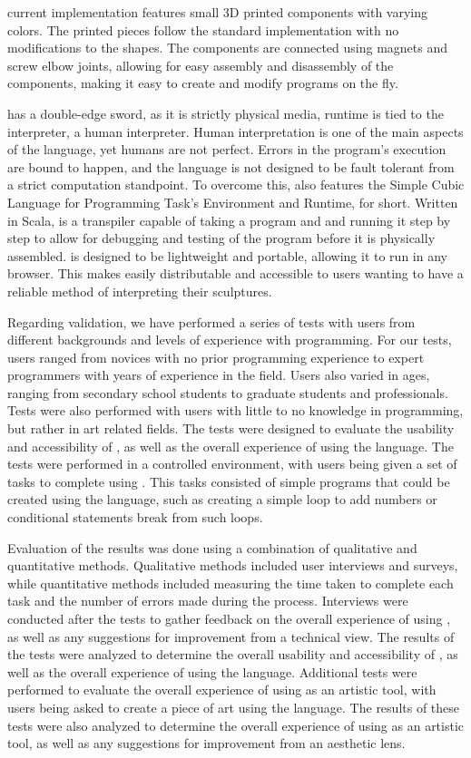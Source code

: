 \sculpt current implementation features small 3D printed components with varying colors.
The printed pieces follow the standard \sculpt implementation with no modifications to the shapes.
The components are connected using magnets and screw elbow joints, allowing for easy assembly and disassembly of the components, making it easy to create and modify programs on the fly.

\sculpt has a double-edge sword, as it is strictly physical media, runtime is tied to the interpreter, a human interpreter.
Human interpretation is one of the main aspects of the language, yet humans are not perfect. Errors in the program's execution are bound to happen, and the language is not designed to be fault tolerant from a strict computation standpoint.
To overcome this, \sculpt also features the Simple Cubic Language for Programming Task's Environment and Runtime, \sculpter for short.
Written in Scala, \sculpter is a transpiler capable of taking a \sculpt program and and running it step by step to allow for debugging and testing of the program before it is physically assembled.
\sculpter is designed to be lightweight and portable, allowing it to run in any browser. This makes easily distributable and accessible to users wanting to have a reliable method of interpreting their sculptures.


Regarding validation, we have performed a series of tests with users from different backgrounds and levels of experience with programming.
For our tests, users ranged from novices with no prior programming experience to expert programmers with years of experience in the field.
Users also varied in ages, ranging from secondary school students to graduate students and professionals.
Tests were also performed with users with little to no knowledge in programming, but rather in art related fields.
The tests were designed to evaluate the usability and accessibility of \sculpt, as well as the overall experience of using the language.
The tests were performed in a controlled environment, with users being given a set of tasks to complete using \sculpt.
This tasks consisted of simple programs that could be created using the language, such as creating a simple loop to add numbers or conditional statements break from such loops.

Evaluation of the results was done using a combination of qualitative and quantitative methods.
Qualitative methods included user interviews and surveys, while quantitative methods included measuring the time taken to complete each task and the number of errors made during the process.
Interviews were conducted after the tests to gather feedback on the overall experience of using \sculpt, as well as any suggestions for improvement from a technical view.
The results of the tests were analyzed to determine the overall usability and accessibility of \sculpt, as well as the overall experience of using the language.
Additional tests were performed to evaluate the overall experience of using \sculpt as an artistic tool, with users being asked to create a piece of art using the language.
The results of these tests were also analyzed to determine the overall experience of using \sculpt as an artistic tool, as well as any suggestions for improvement from an aesthetic lens.
\endinput